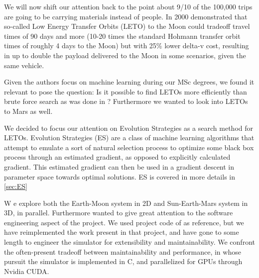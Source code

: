We will now shift our attention back to the point about 9/10 of the 100,000 trips are going to be carrying materials instead of people. In 2000 \cite{Belbruno2000} demonstrated that so-called Low Energy Transfer Orbits (LETO) to the Moon could tradeoff travel times of 90 days and more (10-20 times the standard Hohmann transfer orbit times of roughly 4 days to the Moon) but with 25\% lower delta-v cost, resulting in up to double the payload delivered to the Moon in some scenarios, given the same vehicle.

Given the authors focus on machine learning during our MSc degrees, we found it relevant to pose the question: Is it possible to find LETOs more efficiently than brute force search as was done in \cite{Saxe2015}? Furthermore we wanted to look into LETOs to Mars as well.

We decided to focus our attention on Evolution Strategies as a search method for LETOs. Evolution Strategies (ES) are a class of machine learning algorithms that attempt to emulate a sort of natural selection process to optimize some black box process through an estimated gradient, as opposed to explicitly calculated gradient. This estimated gradient can then be used in a gradient descent in parameter space towards optimal solutions. ES is covered in more details in \cref{sec:ES}

W e explore both the Earth-Moon system in 2D and Sun-Earth-Mars system in 3D, in parallel. Furthermore wanted to give great attention to the software engineering aspect of the project. We used project code of \cite{Saxe2015} as reference, but we have reimplemented the work present in that project, and have gone to some length to engineer the simulator for extensibility and maintainability. We confront the often-present tradeoff between maintainability and performance, in whose pursuit the simulator is implemented in C, and parallelized for GPUs through Nvidia CUDA.

